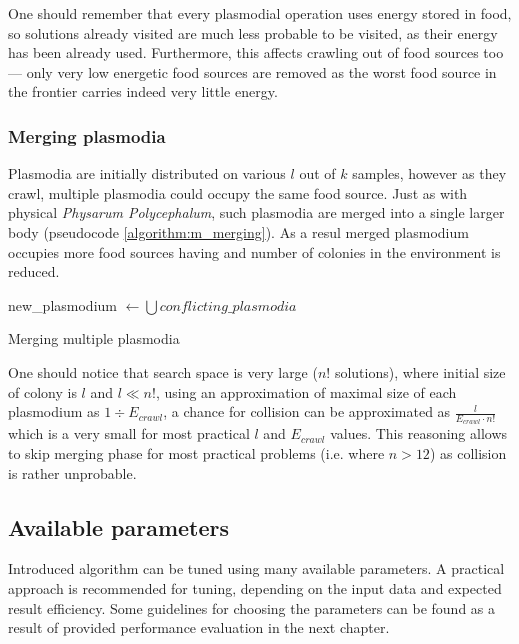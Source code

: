One should remember that every plasmodial operation uses energy stored in food, so solutions already visited are much less probable to be visited, as their energy has been already used. Furthermore, this affects crawling out of food sources too --- only very low energetic food sources are removed as the worst food source in the frontier carries indeed very little energy.


\subsubsection{Merging plasmodia}

Plasmodia are initially distributed on various $l$ out of $k$ samples, however as they crawl, multiple plasmodia could occupy the same food source. Just as with physical \textit{Physarum Polycephalum}, such plasmodia are merged into a single larger body (pseudocode \ref{algorithm:m_merging}). As a resul merged plasmodium occupies more food sources having and number of colonies in the environment is reduced. 

\begin{algorithm}
  \BlankLine
  
  new\_plasmodium $\leftarrow \bigcup{conflicting\_plasmodia}$\;


  \;

  \caption{Merging multiple plasmodia}
  \label{algorithm:m_merging}
\end{algorithm}

One should notice that search space is very large ($n!$ solutions), where initial size of colony is $l$ and $l \ll n!$, using an approximation of maximal size of each plasmodium as $1 \div E_{crawl}$, a chance for collision can be approximated as $\frac{l}{E_{crawl} \cdot n!}$ which is a very small for most practical $l$ and $E_{crawl}$ values. This reasoning allows to skip merging phase for most practical problems (i.e. where $n > 12$) as collision is rather unprobable.


\subsection{Available parameters}
\label{subsection:am_parameters}

Introduced algorithm can be tuned using many available parameters. A practical approach is recommended for tuning, depending on the input data and expected result efficiency. Some guidelines for choosing the parameters can be found as a result of provided performance evaluation in the next chapter.

